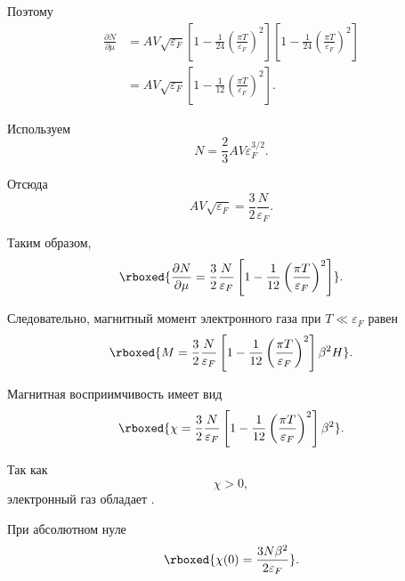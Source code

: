 \documentclass[../final.tex]{subfiles}
\begin{document}
Поэтому
%
\begin{align*}
    \frac{\partial N}{\partial\mu}
    &=
    AV\sqrt{\varepsilon_F}
    \left[
        1
        -
        \frac{1}{24}
        \left(
            \frac{\pi T}{\varepsilon_F}
        \right)^2
    \right]
    \left[
        1
        -
        \frac{1}{24}
        \left(
            \frac{\pi T}{\varepsilon_F}
        \right)^2
    \right]
    \\[6pt]
    &=
    AV\sqrt{\varepsilon_F}
    \left[
        1
        -
        \frac{1}{12}
        \left(
            \frac{\pi T}{\varepsilon_F}
        \right)^2
    \right].
\end{align*}

Используем
%
\begin{equation*}
    N
    =
    \frac{2}{3}
    AV\varepsilon_F^{3/2}.
\end{equation*}

Отсюда
%
\begin{equation*}
    AV\sqrt{\varepsilon_F}
    =
    \frac{3}{2}
    \frac{N}{\varepsilon_F}.
\end{equation*}

Таким образом,
%
\[
    \rboxed{
        \frac{\partial N}{\partial\mu}
        =
        \frac{3}{2}
        \frac{N}{\varepsilon_F}
        \left[
            1
            -
            \frac{1}{12}
            \left(
                \frac{\pi T}{\varepsilon_F}
            \right)^2
        \right]
    }.
\]

Следовательно, магнитный момент электронного газа при
$T\ll\varepsilon_F$ равен
%
\[
    \rboxed{
        M
        =
        \frac{3}{2}
        \frac{N}{\varepsilon_F}
        \left[
            1
            -
            \frac{1}{12}
            \left(
                \frac{\pi T}{\varepsilon_F}
            \right)^2
        \right]
        \beta^2H
    }.
\]

Магнитная восприимчивость имеет вид
%
\[
    \rboxed{
        \chi
        =
        \frac{3}{2}
        \frac{N}{\varepsilon_F}
        \left[
            1
            -
            \frac{1}{12}
            \left(
                \frac{\pi T}{\varepsilon_F}
            \right)^2
        \right]
        \beta^2
    }.
\]

Так как
%
\begin{equation*}
    \chi
    >
    0,
\end{equation*}
%
электронный газ обладает .

При абсолютном нуле
%
\[
    \rboxed{
        \chi(0)
        =
        \frac{
            3N\beta^2
        }{
            2\varepsilon_F
        }
    }.
\]
\end{document}
